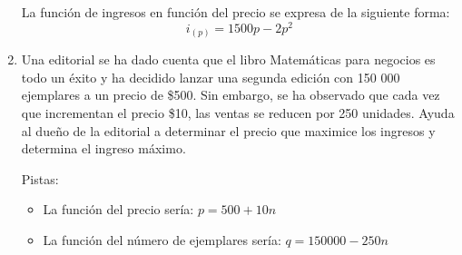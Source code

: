 \documentclass[12pt]{article}
\begin{document}
\begin{enumerate}
    La función de ingresos en función del precio se expresa de la siguiente forma:
    \[i_{(p)} = 1500p-2p^2\]

    \item Una editorial se ha dado cuenta que el libro Matemáticas para negocios es todo un
    éxito y ha decidido lanzar una segunda edición con 150 000 ejemplares a un
    precio de \$500. Sin embargo, se ha observado que cada vez que incrementan el
    precio \$10, las ventas se reducen por 250 unidades. Ayuda al dueño de la editorial
    a determinar el precio que maximice los ingresos y determina el ingreso máximo.

    Pistas: \begin{itemize}
        \item La función del precio sería: $p = 500+10n$
        \item La función del número de ejemplares sería: $q = 150000-250n$
    \end{itemize}
\end{enumerate}


\end{document}
